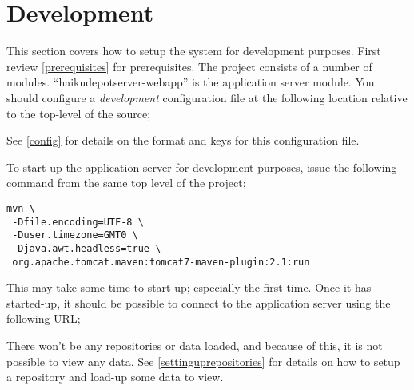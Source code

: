 
\section{Development}

This section covers how to setup the system for development purposes.  First review \ref{prerequisites} for prerequisites.  The project consists of a number of modules.  ``haikudepotserver-webapp'' is the application server module.  You should configure a {\it development} configuration file at the following location relative to the top-level of the source;


See \ref{config} for details on the format and keys for this configuration file.

To start-up the application server for development purposes, issue the following command from the same top level of the project;

\begin{verbatim}
mvn \
 -Dfile.encoding=UTF-8 \
 -Duser.timezone=GMT0 \
 -Djava.awt.headless=true \
 org.apache.tomcat.maven:tomcat7-maven-plugin:2.1:run
\end{verbatim}

This may take some time to start-up; especially the first time.  Once it has started-up, it should be possible to connect to the application server using the following URL;


There won't be any repositories or data loaded, and because of this, it is not possible to view any data.  See \ref{settinguprepositories} for details on how to setup a repository and load-up some data to view.